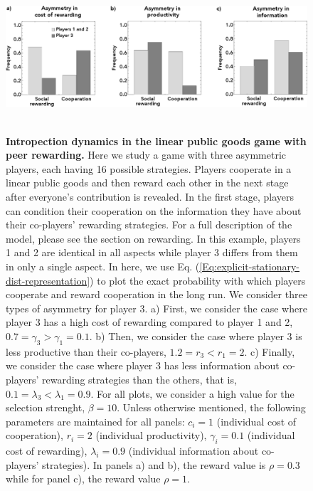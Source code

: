 \documentclass[11pt]{article}
\theoremstyle{plainCl1}
\theoremstyle{plainCl2}
\begin{document}
\clearpage
\begin{figure}
\centering
\includegraphics[width =  \textwidth]{figures/figure4.eps}~\\[0.4cm]
\caption{\onehalfspacing
\textbf{Intropection dynamics in the linear public goods game with peer rewarding.} Here we study a game with three asymmetric players, each having 16 possible strategies. Players cooperate in a linear public goods and then reward each other in the next stage after everyone's contribution is revealed. In the first stage, players can condition their cooperation on the information they have about their co-players' rewarding strategies. For a full description of the model, please see the section on rewarding. In this example, players 1 and 2 are identical in all aspects while player 3 differs from them in only a single aspect. In here, we use Eq. (\ref{Eq:explicit-stationary-dist-representation}) to plot the exact probability with which players cooperate and reward cooperation in the long run. We consider three types of asymmetry for player 3. a) First, we consider the case where player 3 has a high cost of rewarding compared to player 1 and 2, $0.7 = \gamma_3 > \gamma_1 = 0.1$. b) Then, we consider the case where player 3 is less productive than their co-players, $1.2 = r_3 < r_1 = 2$. c) Finally, we consider the case where player 3 has less information about co-players' rewarding strategies than the others, that is, $0.1 = \lambda_3 < \lambda_1 = 0.9$. For all plots, we consider a high value for the selection strenght, $\beta = 10$. Unless otherwise mentioned, the following parameters are maintained for all panels: $c_i = 1$ (individual cost of cooperation), $r_i = 2$ (individual productivity), $\gamma_i = 0.1$ (individual cost of rewarding), $\lambda_i = 0.9$ (individual information about co-players' strategies). In panels a) and b), the reward value is $\rho=0.3$ while for panel c), the reward value $\rho = 1$.}
\label{Fig:SocialRewarding}
\end{figure}

\clearpage

\newpage

\end{document}
